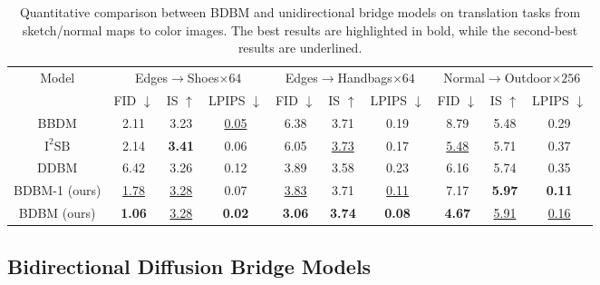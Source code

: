 \begin{table*}
\begin{centering}
\begin{tabular}{cccccccccc}
\toprule 
\multirow{2}{*}{Model} & \multicolumn{3}{c}{Edges$\rightarrow$Shoes$\times64$} & \multicolumn{3}{c}{Edges$\rightarrow$Handbags$\times64$} & \multicolumn{3}{c}{Normal$\rightarrow$Outdoor$\times256$}\tabularnewline
\cmidrule{2-10} 
 & FID $\downarrow$ & IS $\uparrow$ & LPIPS $\downarrow$ & FID $\downarrow$ & IS $\uparrow$ & LPIPS $\downarrow$ & FID $\downarrow$ & IS $\uparrow$ & LPIPS $\downarrow$\tabularnewline
\midrule
\midrule 
BBDM & 2.11 & 3.23 & \uline{0.05} & 6.38 & 3.71 & 0.19 & 8.79 & 5.48 & 0.29\tabularnewline
\midrule 
$\text{I}^{2}\text{SB}$ & 2.14 & \textbf{3.41} & 0.06 & 6.05 & \uline{3.73} & 0.17 & \uline{5.48} & 5.71 & 0.37\tabularnewline
\midrule 
DDBM & 6.42 & 3.26 & 0.12 & 3.89 & 3.58 & 0.23 & 6.16 & 5.74 & 0.35\tabularnewline
\midrule
\midrule 
BDBM-1 (ours) & \uline{1.78} & \uline{3.28} & 0.07 & \uline{3.83} & 3.71 & \uline{0.11} & 7.17 & \textbf{5.97} & \textbf{0.11}\tabularnewline
\midrule 
BDBM (ours) & \textbf{1.06} & \uline{3.28} & \textbf{0.02} & \textbf{3.06} & \textbf{3.74} & \textbf{0.08} & \textbf{4.67} & \uline{5.91} & \uline{0.16}\tabularnewline
\bottomrule
\end{tabular}
\par\end{centering}
\caption{Quantitative comparison between BDBM and unidirectional bridge models
on translation tasks from sketch/normal maps to color images. The
best results are highlighted in bold, while the second-best results
are underlined.\label{tab:main_result_1}}
\end{table*}


\subsection{Bidirectional Diffusion Bridge Models\label{subsec:Bidirectional-Diffusion-Bridge-Models}}

